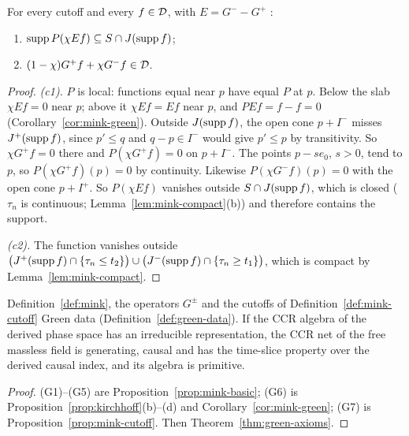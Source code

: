 \begin{proposition}\label{prop:mink-cutoff}
For every cutoff  and every $f\in\mathcal D$, with $E=G^--G^+$ :
\begin{enumerate}[label=(c\arabic*),leftmargin=2.5em]
\item $\operatorname{supp} P(\chi Ef)\subseteq S\cap J(\operatorname{supp} f)$;
\item $(1-\chi)G^+f+\chi G^-f\in\mathcal D$.
\end{enumerate}
\end{proposition}
\begin{proof}
\emph{(c1).} $P$ is local: functions equal near $p$ have equal $P$ at $p$. Below the slab
$\chi Ef=0$ near $p$; above it $\chi Ef=Ef$ near $p$, and $PEf=f-f=0$ (Corollary~\ref{cor:mink-green}).
Outside $J(\operatorname{supp} f)$, the open cone $p+I^-$ misses $J^+(\operatorname{supp} f)$, since $p'\leq q$ and $q-p\in I^-$
would give $p'\leq p$ by transitivity. So $\chi G^+f=0$ there and $P(\chi G^+f)=0$ on $p+I^-$. The
points $p-se_0$, $s>0$, tend to $p$, so $P(\chi G^+f)(p)=0$ by continuity. Likewise
$P(\chi G^-f)(p)=0$ with the open cone $p+I^+$. So $P(\chi Ef)$ vanishes outside $S\cap J(\operatorname{supp} f)$, which is closed ($\tau_n$ is continuous;
Lemma~\ref{lem:mink-compact}(b)) and therefore contains the support.

\emph{(c2).} The function vanishes outside
$\bigl(J^+(\operatorname{supp} f)\cap\{\tau_n\leq t_2\}\bigr)\cup\bigl(J^-(\operatorname{supp} f)\cap\{\tau_n\geq t_1\}\bigr)$,
which is compact by Lemma~\ref{lem:mink-compact}.
\end{proof}

\begin{theorem}\label{thm:mink-green}
 Definition~\ref{def:mink}, the operators $G^\pm$  and the cutoffs of Definition~\ref{def:mink-cutoff}
 Green data (Definition~\ref{def:green-data}). If the CCR algebra of the derived phase space has
an irreducible representation, the CCR net of the free massless field is generating, causal and
has the time-slice property over the derived causal index, and its algebra is primitive.
\end{theorem}
\begin{proof}
(G1)--(G5) are Proposition~\ref{prop:mink-basic}; (G6) is Proposition~\ref{prop:kirchhoff}(b)--(d)
and Corollary~\ref{cor:mink-green}; (G7) is Proposition~\ref{prop:mink-cutoff}. Then
Theorem~\ref{thm:green-axioms}.
\end{proof}
\noindent{}

